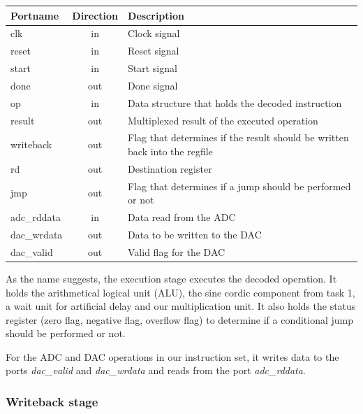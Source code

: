 \begin{center}
	\begin{tabular}{ | l | c | l | }
		\hline
		\textbf{Portname} & \textbf{Direction} & \textbf{Description} \\
		\hline
		clk & in & Clock signal \\
		reset & in  & Reset signal \\
		start & in  & Start signal \\
		done & out  & Done signal \\
		op & in  & Data structure that holds the decoded instruction \\
		result & out  & Multiplexed result of the executed operation \\
		writeback & out  & Flag that determines if the result should be written back into the regfile \\
		rd & out  & Destination register \\
		jmp & out  & Flag that determines if a jump should be performed or not \\
		adc\_rddata & in  & Data read from the ADC \\
		dac\_wrdata & out  & Data to be written to the DAC \\
		dac\_valid & out  & Valid flag for the DAC \\
		\hline
	\end{tabular} 
\end{center}

As the name suggests, the execution stage executes the decoded operation. It holds the arithmetical logical unit (ALU), the sine cordic component from task 1, a wait unit for artificial delay and our multiplication unit. It also holds the status register (zero flag, negative flag, overflow flag) to determine if a conditional jump should be performed or not.

For the ADC and DAC operations in our instruction set, it writes data to the ports \textit{dac\_valid} and \textit{dac\_wrdata} and reads from the port \textit{adc\_rddata}.

\subsubsection{Writeback stage}


